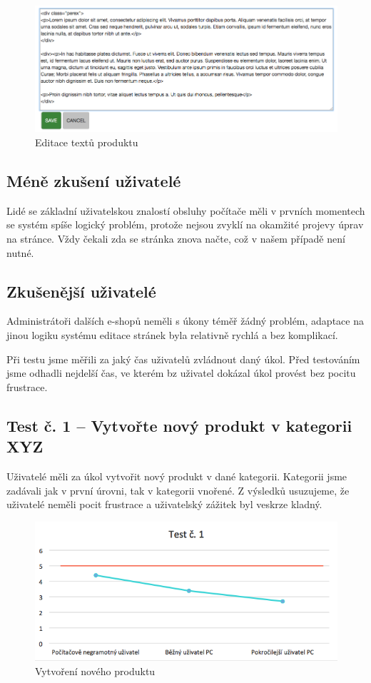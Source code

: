 \documentclass[11pt,a4paper]{article}
\begin{document}
\begin{figure}[h]
    \centering
    \includegraphics[width=\textwidth]{edit.png}
    \caption{Editace textů produktu}
\end{figure}

\subsection*{Méně zkušení uživatelé}
Lidé se základní uživatelskou znalostí obsluhy počítače měli v prvních momentech se systém spíše logický problém, protože nejsou zvyklí na okamžité projevy úprav na stránce. Vždy čekali zda se stránka znova načte, což v našem případě není nutné.

\subsection*{Zkušenější uživatelé}
Administrátoři dalších e-shopů neměli s úkony téměř žádný problém, adaptace na jinou logiku systému editace stránek byla relativně rychlá a bez komplikací.


Při testu jsme měřili za jaký čas uživatelů zvládnout daný úkol. Před testováním jsme odhadli nejdelší čas, ve kterém bz uživatel dokázal úkol provést bez pocitu frustrace.

\subsection*{Test č. 1 -- Vytvořte nový produkt v kategorii XYZ}
Uživatelé měli za úkol vytvořit nový produkt v dané kategorii. Kategorii jsme zadávali jak v první úrovni, tak v kategorii vnořené. Z výsledků usuzujeme, že uživatelé neměli pocit frustrace a uživatelský zážitek byl veskrze kladný.

\begin{figure}[ht]
    \centering
    \includegraphics[width=\textwidth]{t1.png}
    \caption{Vytvoření nového produktu}
\end{figure}
\end{document}
